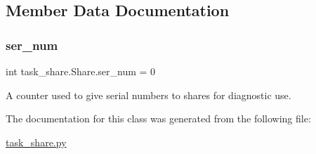\subsection{Member Data Documentation}
\mbox{\label{classtask__share_1_1_share_a2e8df029af46fbfd44ef0c2e7e8c7af6}} 
\subsubsection{\texorpdfstring{ser\_num}{ser\_num}}
{\footnotesize\ttfamily int task\+\_\+share.\+Share.\+ser\+\_\+num = 0\hspace{0.3cm}{\ttfamily [static]}}



A counter used to give serial numbers to shares for diagnostic use. 



The documentation for this class was generated from the following file\+:\begin{DoxyCompactItemize}
\item 
\mbox{\hyperlink{task__share_8py}{task\+\_\+share.\+py}}\end{DoxyCompactItemize}

